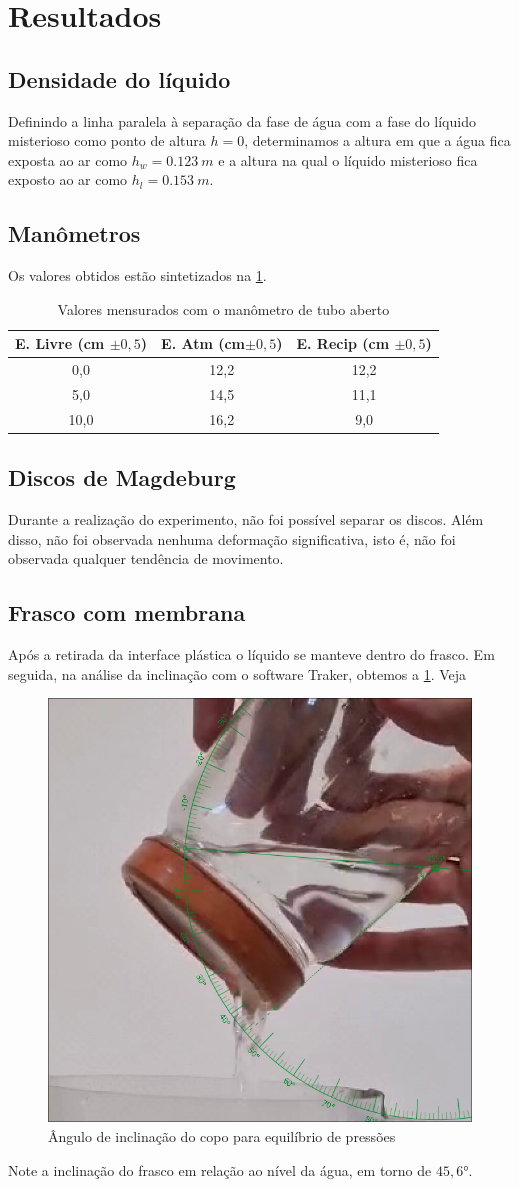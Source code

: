 \section{Resultados}
\subsection{Densidade do líquido}
Definindo a linha paralela à separação da fase de água com a fase do líquido
misterioso como ponto de altura \(h = 0\), determinamos a altura em que a
água fica exposta ao ar como \(h_w = \qty{0,123}{m}\) e a altura na qual o
líquido misterioso fica exposto ao ar como \(h_l = \qty{0,153}{m}\). 

\subsection{Manômetros}
Os valores obtidos estão sintetizados na \cref{tab_man}.

\begin{table}[H]
    \centering
    \begin{tabular}{c | c | c}
        \hline
        \textbf{E. Livre (cm \(\pm 0,5\))} & \textbf{E. Atm (cm\(\pm 0,5\))} & \textbf{E. Recip (cm \(\pm0,5\))}\\
        \hline
        0,0 & 12,2 & 12,2\\
        \hline
        5,0 & 14,5 & 11,1\\
        \hline
        10,0 & 16,2 & 9,0\\
        \hline
    \end{tabular}
    \caption{Valores mensurados com o manômetro de tubo aberto}
    \label{tab_man}
\end{table}

\subsection{Discos de Magdeburg}
Durante a realização do experimento, não foi possível separar os discos. Além
disso, não foi observada nenhuma deformação significativa, isto é, não foi
observada qualquer tendência de movimento. 

\subsection{Frasco com membrana}
Após a retirada da interface plástica o líquido se manteve dentro do frasco. Em
seguida, na análise da inclinação com o software Traker, obtemos a \cref{copo.png}. Veja
\begin{figure}[H]
    \centering
    \includegraphics[width=.35\linewidth]{fig/copo.png}
    \caption{Ângulo de inclinação do copo para equilíbrio de pressões}
    \label{copo.png}
\end{figure}

Note a inclinação do frasco em relação ao nível da água, em torno de \( 45,6 \)°.

